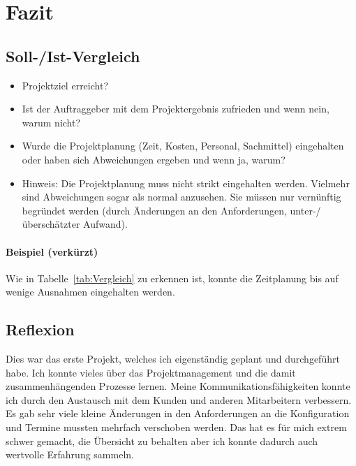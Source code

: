 \section{Fazit} 
\label{sec:Fazit}

\subsection{Soll-/Ist-Vergleich}
\label{sec:SollIstVergleich}

\begin{itemize}
	\item Projektziel erreicht?
	\item Ist der Auftraggeber mit dem Projektergebnis zufrieden und wenn nein, warum nicht?
	\item Wurde die Projektplanung (Zeit, Kosten, Personal, Sachmittel) eingehalten oder haben sich Abweichungen ergeben und wenn ja, warum?
	\item Hinweis: Die Projektplanung muss nicht strikt eingehalten werden. Vielmehr sind Abweichungen sogar als normal anzusehen. Sie müssen nur vernünftig begründet werden (\zB durch Änderungen an den Anforderungen, unter-/überschätzter Aufwand).
\end{itemize}

\paragraph{Beispiel (verkürzt)}
Wie in Tabelle~\ref{tab:Vergleich} zu erkennen ist, konnte die Zeitplanung bis auf wenige Ausnahmen eingehalten werden.


\subsection{Reflexion}
\label{sec:Reflexion}
Dies war das erste Projekt, welches ich eigenständig geplant und durchgeführt habe. Ich konnte vieles über das Projektmanagement und die damit zusammenhängenden Prozesse lernen. Meine Kommunikationsfähigkeiten konnte ich durch den Austausch mit dem Kunden und anderen Mitarbeitern verbessern. Es gab sehr viele kleine Änderungen in den Anforderungen an die Konfiguration und Termine mussten mehrfach verschoben werden. Das hat es für mich extrem schwer gemacht, die Übersicht zu behalten aber ich konnte dadurch auch wertvolle Erfahrung sammeln.
\begin{comment}
	\item Was hat der Prüfling bei der Durchführung des Projekts gelernt (\zB Zeitplanung, Vorteile der eingesetzten Frameworks, Änderungen der Anforderungen)?
\end{comment}

